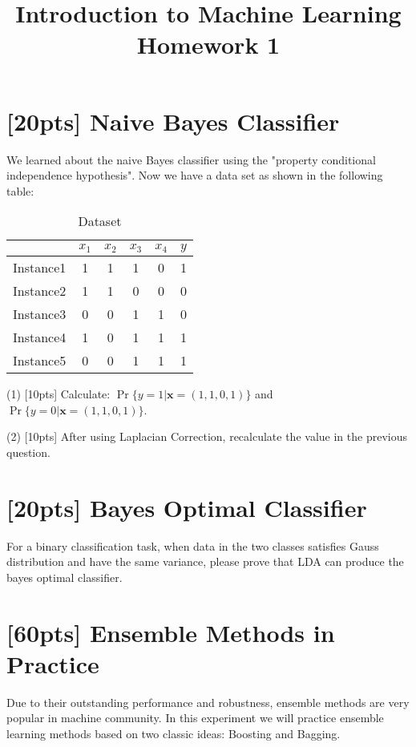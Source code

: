 \documentclass{article}
\title{Introduction to Machine Learning\\Homework 1}
\begin{document}
	\maketitle
	\section{[20pts] Naive Bayes Classifier}
		
		We learned about the naive Bayes classifier using the "property conditional independence hypothesis". Now we have a data set as shown in the following table:
		\begin{table}[htp]
			\centering
			\caption{Dataset}\label{tab:aStrangeTable}
		\begin{tabular}{c|ccccc}
			\hline 
			& $x_1$ & $x_2$ & $x_3$ & $x_4$ & $y$ \\ 
			\hline 
		Instance1	& 1 & 1 & 1 & 0 & 1 \\ 
			\hline 
		Instance2	& 1 & 1 & 0 & 0 & 0 \\ 
			\hline 
		Instance3	& 0 & 0 & 1 & 1 & 0 \\ 
			\hline 
		Instance4	& 1 & 0 & 1 & 1 & 1 \\ 
			\hline 
		Instance5	& 0 & 0 & 1 & 1 & 1 \\ 
			\hline 
		\end{tabular}
		\end{table} 
		

			(1) [10pts]  Calculate: $\Pr\{ y=1 | \mathbf{x}=(1,1,0,1) \}$ and $\Pr\{ y=0 | \mathbf{x}=(1,1,0,1) \}$.
			
			(2) [10pts] After using Laplacian Correction, recalculate the value in the previous question.
			
	\section{[20pts] Bayes Optimal Classifier}
	
	For a binary classification task, when data in the two classes satisfies Gauss distribution and have the same variance, please prove that LDA can produce the bayes optimal classifier.
	
	\section{[60pts] Ensemble Methods in Practice}
	
	Due to their outstanding performance and robustness, ensemble methods are very popular in machine community. In this experiment we will practice ensemble learning methods based on two classic
	ideas: Boosting and Bagging.
	
\end{document}
